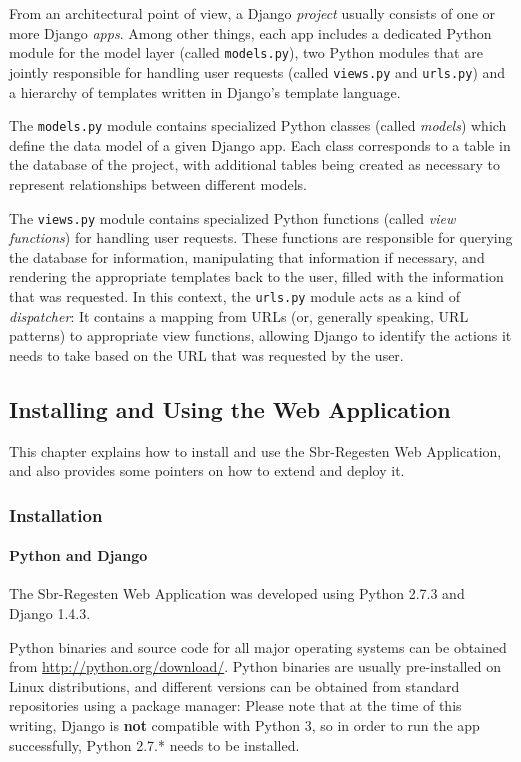 From an architectural point of view, a Django \emph{project} usually
consists of one or more Django \emph{apps}. Among other things, each
app includes a dedicated Python module for the model layer (called
\texttt{models.py}), two Python modules that are jointly responsible for
handling user requests (called \texttt{views.py} and \texttt{urls.py})
and a hierarchy of templates written in Django's template language.

The \texttt{models.py} module contains specialized Python classes
(called \emph{models}) which define the data model of a given Django
app. Each class corresponds to a table in the database of the project,
with additional tables being created as necessary to represent
relationships between different models.

The \texttt{views.py} module contains specialized Python functions
(called \emph{view functions}) for handling user requests. These
functions are responsible for querying the database for information,
manipulating that information if necessary, and rendering the
appropriate templates back to the user, filled with the information
that was requested. In this context, the \texttt{urls.py} module acts
as a kind of \emph{dispatcher}: It contains a mapping from URLs (or,
generally speaking, URL patterns) to appropriate view functions,
allowing Django to identify the actions it needs to take based on the
URL that was requested by the user.

\subsection{Installing and Using the Web Application}
\label{sec:install-run-use}

This chapter explains how to install and use the Sbr-Regesten Web
Application, and also provides some pointers on how to extend and
deploy it.

\subsubsection{Installation}
\label{sec:install}

\paragraph{Python and Django}
The Sbr-Regesten Web Application was developed using Python 2.7.3 and
Django 1.4.3.

Python binaries and source code for all major operating systems can be
obtained from \url{http://python.org/download/}. Python binaries are
usually pre-installed on Linux distributions, and different versions
can be obtained from standard repositories using a package manager:
Please note that at the time of this writing, Django is \textbf{not}
compatible with Python 3, so in order to run the app successfully,
Python 2.7.* needs to be installed.

